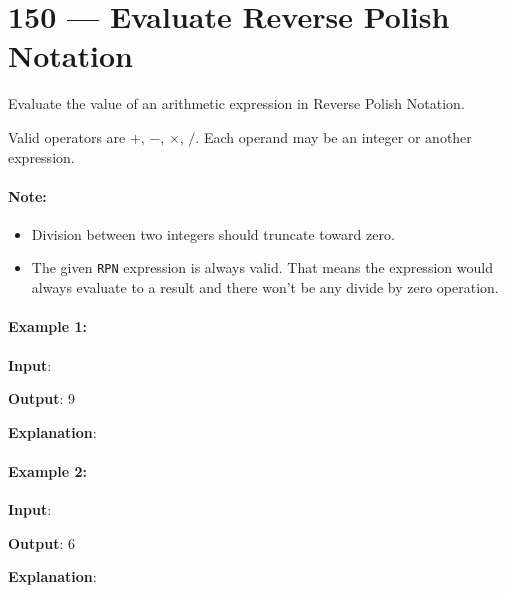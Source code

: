 \section{150 --- Evaluate Reverse Polish Notation}
Evaluate the value of an arithmetic expression in Reverse Polish Notation.
\par
Valid operators are $+$, $-$, $\times$, $/$. Each operand may be an integer or another expression.
\paragraph{Note:}
\begin{itemize}
    \item Division between two integers should truncate toward zero.
    \item The given \texttt{RPN} expression is always valid. That means the expression would always evaluate to a result and there won't be any divide by zero operation.
\end{itemize}

\paragraph{Example 1:}
\begin{flushleft}
\textbf{Input}: \fcj{["2", "1", "+", "3", "*"]}

\textbf{Output}: 9

\textbf{Explanation}: 
\end{flushleft}

\paragraph{Example 2:}

\begin{flushleft}
\textbf{Input}: \fcj{["4", "13", "5", "/", "+"]}

\textbf{Output}: 6

\textbf{Explanation}: 
\end{flushleft}
